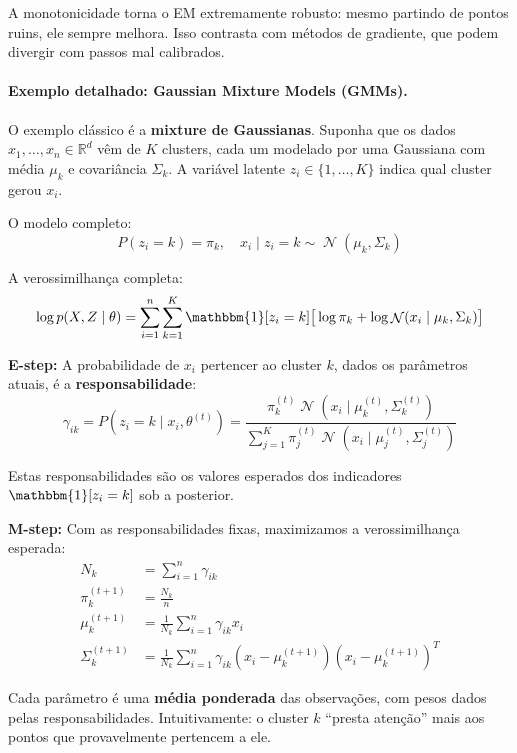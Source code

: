 \documentclass{tufte-handout}
\DeclareMathOperator{\N}{\mathcal{N}}
\begin{document}
\begin{remark}
    A monotonicidade torna o EM extremamente robusto: mesmo partindo de pontos ruins, ele sempre melhora. Isso contrasta com métodos de gradiente, que podem divergir com passos mal calibrados.
\end{remark}

\paragraph{Exemplo detalhado: Gaussian Mixture Models (GMMs).}

O exemplo clássico é a \textbf{mixture de Gaussianas}. Suponha que os dados $x_1, \dots, x_n \in \mathbb{R}^d$ vêm de $K$ clusters, cada um modelado por uma Gaussiana com média $\mu_k$ e covariância $\Sigma_k$. A variável latente $z_i \in \{1,\dots,K\}$ indica qual cluster gerou $x_i$.

O modelo completo:
\[
P(z_i = k) = \pi_k, \quad x_i \mid z_i = k \sim \N(\mu_k, \Sigma_k)
\]

A verossimilhança completa:
\[
\log p(X, Z \mid \theta) = \sum_{i=1}^n \sum_{k=1}^K \mathbbm{1}[z_i = k] \big[\log \pi_k + \log \N(x_i \mid \mu_k, \Sigma_k)\big]
\]

\textbf{E-step:} A probabilidade de $x_i$ pertencer ao cluster $k$, dados os parâmetros atuais, é a \textbf{responsabilidade}:
\[
\gamma_{ik} = P(z_i = k \mid x_i, \theta^{(t)}) = \frac{\pi_k^{(t)} \N(x_i \mid \mu_k^{(t)}, \Sigma_k^{(t)})}{\sum_{j=1}^K \pi_j^{(t)} \N(x_i \mid \mu_j^{(t)}, \Sigma_j^{(t)})}
\]

Estas responsabilidades são os valores esperados dos indicadores $\mathbbm{1}[z_i = k]$ sob a posterior.

\textbf{M-step:} Com as responsabilidades fixas, maximizamos a verossimilhança esperada:
\begin{align*}
    N_k &= \sum_{i=1}^n \gamma_{ik} \\
    \pi_k^{(t+1)} &= \frac{N_k}{n} \\
    \mu_k^{(t+1)} &= \frac{1}{N_k} \sum_{i=1}^n \gamma_{ik} x_i \\
    \Sigma_k^{(t+1)} &= \frac{1}{N_k} \sum_{i=1}^n \gamma_{ik} (x_i - \mu_k^{(t+1)})(x_i - \mu_k^{(t+1)})^T
\end{align*}

Cada parâmetro é uma \textbf{média ponderada} das observações, com pesos dados pelas responsabilidades. Intuitivamente: o cluster $k$ ``presta atenção'' mais aos pontos que provavelmente pertencem a ele.
\end{document}
